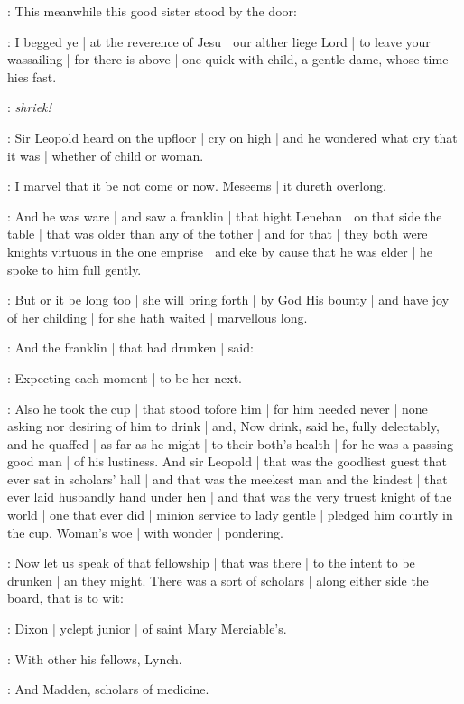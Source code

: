 :
This meanwhile this good sister stood by the door:

\nursecallan:
I begged ye |
at the reverence of Jesu |
our alther liege Lord |
to leave your wassailing |
for there is above |
one quick with child,
a gentle dame,
whose time hies fast.

\All:
\emph{shriek!}

:
Sir Leopold heard on the upfloor |
cry on high |
and he wondered what cry that it was |
whether of child or woman.

\Bloom:
I marvel that it be not come or now.
Meseems |
it dureth overlong.

:
And he was ware |
and saw a franklin |
that hight Lenehan |
on that side the table |
that was older than any of the tother |
and for that |
they both were knights virtuous in the one emprise |
and eke by cause that he was elder |
he spoke to him full gently.

\Bloom:
But or it be long too |
she will bring forth |
by God His bounty |
and have joy of her childing |
for she hath waited |
marvellous long.

:
And the franklin |
that had drunken |
said:

\lenehan:
Expecting each moment |
to be her next.

:
Also he took the cup |
that stood tofore him |
for him needed never |
none asking nor desiring of him to drink |
and,
Now drink,
said he,
fully delectably,
and he quaffed |
as far as he might |
to their both's health |
for he was a passing good man |
of his lustiness.
And sir Leopold |
that was the goodliest guest that ever sat in scholars' hall |
and that was the meekest man and the kindest |
that ever laid husbandly hand under hen |
and that was the very truest knight of the world |
one that ever did |
minion service to lady gentle |
pledged him courtly in the cup.
Woman's woe |
with wonder |
pondering.


:
Now let us speak of that fellowship |
that was there |
to the intent to be drunken |
an they might.
There was a sort of scholars |
along either side the board,
that is to wit:

:
Dixon |
yclept junior |
of saint Mary Merciable's.

:
With other his fellows,
Lynch.

:
And Madden,
scholars of medicine.

